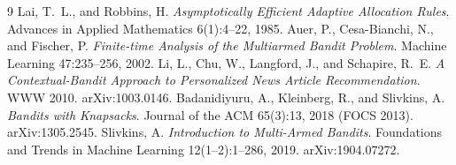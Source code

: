\documentclass[10pt,twocolumn]{article}
\begin{document}
\begin{thebibliography}{9}
 Lai, T.~L., and Robbins, H. \emph{Asymptotically Efficient Adaptive Allocation Rules}. Advances in Applied Mathematics 6(1):4--22, 1985.
 Auer, P., Cesa-Bianchi, N., and Fischer, P. \emph{Finite-time Analysis of the Multiarmed Bandit Problem}. Machine Learning 47:235--256, 2002.
 Li, L., Chu, W., Langford, J., and Schapire, R.~E. \emph{A Contextual-Bandit Approach to Personalized News Article Recommendation}. WWW 2010. arXiv:1003.0146.
 Badanidiyuru, A., Kleinberg, R., and Slivkins, A. \emph{Bandits with Knapsacks}. Journal of the ACM 65(3):13, 2018 (FOCS 2013). arXiv:1305.2545.
 Slivkins, A. \emph{Introduction to Multi-Armed Bandits}. Foundations and Trends in Machine Learning 12(1--2):1--286, 2019. arXiv:1904.07272.
\end{thebibliography}
\end{document}
